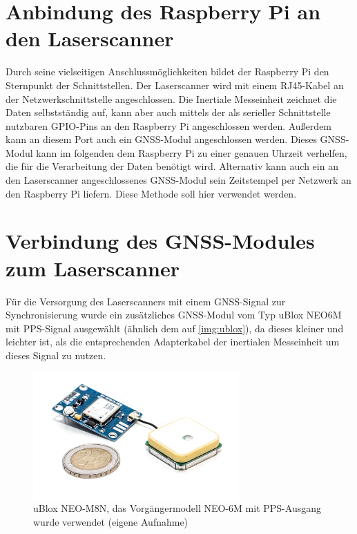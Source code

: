 \documentclass[a4paper,12pt,bibliography=totoc, listof=totoc,titlepage,pointlessnumbers]{scrreprt}
\begin{document}
\section{Anbindung des Raspberry Pi an den Laserscanner}
Durch seine vielseitigen Anschlussmöglichkeiten bildet der Raspberry Pi den Sternpunkt der Schnittstellen. Der Laserscanner wird mit einem RJ45-Kabel an der Netzwerkschnittstelle angeschlossen. Die Inertiale Messeinheit zeichnet die Daten selbstständig auf, kann aber auch mittels der als serieller Schnittstelle nutzbaren GPIO-Pins an den Raspberry Pi angeschlossen werden. Außerdem kann an diesem Port auch ein GNSS-Modul angeschlossen werden. Dieses GNSS-Modul kann im folgenden dem Raspberry Pi zu einer genauen Uhrzeit verhelfen, die für die Verarbeitung der Daten benötigt wird. Alternativ kann auch ein an den Laserscanner angeschlossenes GNSS-Modul sein Zeitstempel per Netzwerk an den Raspberry Pi liefern. Diese Methode soll hier verwendet werden.

\section{Verbindung des GNSS-Modules zum Laserscanner}
\label{s:GNSSAnschluss}
Für die Versorgung des Laserscanners mit einem GNSS-Signal zur Synchronisierung wurde ein zusätzliches GNSS-Modul vom Typ uBlox NEO6M mit PPS-Signal ausgewählt (ähnlich dem auf \autoref{img:ublox}), da dieses kleiner und leichter ist, als die entsprechenden Adapterkabel der inertialen Messeinheit um dieses Signal zu nutzen.

\begin{figure}[ht!]
 \centering
 \includegraphics[width=0.7\textwidth]{./img/ublox.jpg}
 \caption{uBlox NEO-M8N, das Vorgängermodell NEO-6M mit PPS-Ausgang wurde verwendet (eigene Aufnahme)}
 \label{img:ublox}
\end{figure}
\end{document}
